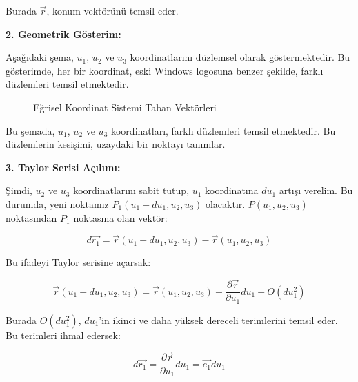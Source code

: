 \documentclass[11pt,letterpaper,twocolumn]{fenbil}
\begin{document}
Burada $\vec{r}$, konum vektörünü temsil eder.

\textbf{2. Geometrik Gösterim:}

Aşağıdaki şema, $u_1$, $u_2$ ve $u_3$ koordinatlarını düzlemsel olarak göstermektedir. Bu gösterimde, her bir koordinat, eski Windows logosuna benzer şekilde, farklı düzlemleri temsil etmektedir.

\begin{figure}[htbp]
    \centering
    \caption{Eğrisel Koordinat Sistemi Taban Vektörleri}
    \label{fig:egrisel_taban_vektorleri}
\end{figure}

Bu şemada, $u_1$, $u_2$ ve $u_3$ koordinatları, farklı düzlemleri temsil etmektedir. Bu düzlemlerin kesişimi, uzaydaki bir noktayı tanımlar.

\textbf{3. Taylor Serisi Açılımı:}

Şimdi, $u_2$ ve $u_3$ koordinatlarını sabit tutup, $u_1$ koordinatına $du_1$ artışı verelim. Bu durumda, yeni noktamız $P_1(u_1 + du_1, u_2, u_3)$ olacaktır. $P(u_1, u_2, u_3)$ noktasından $P_1$ noktasına olan vektör:

\begin{equation}
d\vec{r_1} = \vec{r}(u_1 + du_1, u_2, u_3) - \vec{r}(u_1, u_2, u_3)
\end{equation}

Bu ifadeyi Taylor serisine açarsak:

\begin{equation}
\vec{r}(u_1 + du_1, u_2, u_3) = \vec{r}(u_1, u_2, u_3) + \frac{\partial \vec{r}}{\partial u_1} du_1 + O(du_1^2)
\end{equation}

Burada $O(du_1^2)$, $du_1$'in ikinci ve daha yüksek dereceli terimlerini temsil eder. Bu terimleri ihmal edersek:

\begin{equation}
d\vec{r_1} = \frac{\partial \vec{r}}{\partial u_1} du_1 = \vec{e_1} du_1
\end{equation}
\end{document}
